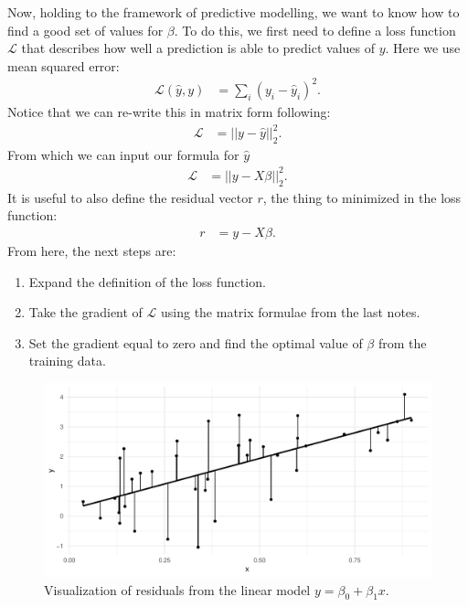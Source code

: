 \documentclass[12pt,hidelinks]{article}
\numberwithin{equation}{section}
\begin{document}
Now, holding to the framework of predictive modelling, we want to know how to
find a good set of values for $\beta$. To do this, we first need to define a loss
function $\mathcal{L}$ that describes how well a prediction is able to predict
values of $y$. Here we use mean squared error:
\begin{align}
\mathcal{L}(\widehat{y}, y) &= \sum_i (y_i - \widehat{y}_i)^2.
\end{align}
Notice that we can re-write this in matrix form following:
\begin{align}
\mathcal{L} &= || y - \widehat{y} ||_2^2.
\end{align}
From which we can input our formula for $\widehat{y}$
\begin{align}
\mathcal{L} &= || y - X \beta ||_2^2. \label{lloss}
\end{align}
It is useful to also define the residual vector $r$, the thing to minimized
in the loss function:
\begin{align}
r &= y - X\beta.
\end{align}
From here, the next steps are:
\begin{enumerate}
\item Expand the definition of the loss function.
\item Take the gradient of $\mathcal{L}$ using the matrix formulae from the last notes.
\item Set the gradient equal to zero and find the optimal value of $\beta$ from
the training data.
\end{enumerate}

\begin{figure}
\includegraphics[width=\textwidth]{figures/lm_residuals.pdf}
\caption[Residuals from a simple linear model]{Visualization of residuals
from the linear model $y = \beta_0 + \beta_1 x$.}
\label{lm_residuals}
\end{figure}
\end{document}
